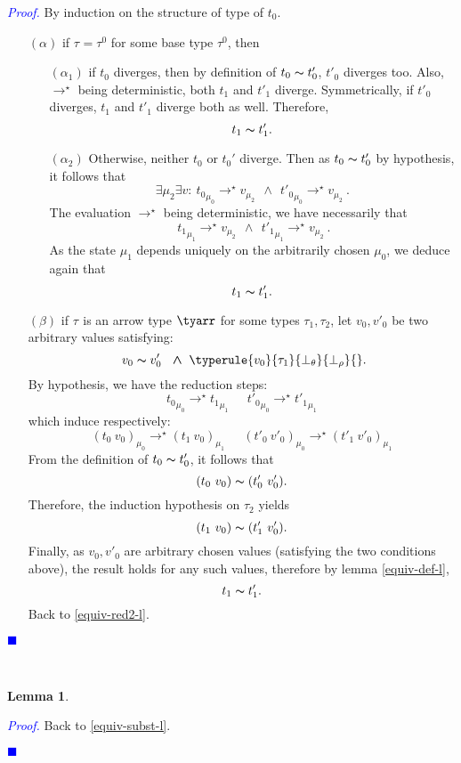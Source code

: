 \documentclass[a4paper,11pt,oneside]{article}
\theoremstyle{plain}
\newtheorem{lemma}[definition]{Lemma}
\renewenvironment{proof}{\noindent \textcolor{blue}{\textit{Proof.}}}
{{\begin{tiny}\textcolor{blue}{$\blacksquare$}\end{tiny}}\\}
\newcommand{\tmapp}[2]{(#1 ~ #2)}
\newcommand{\ty}[1][]{\tau_{#1}}
\newcommand{\bwedge}{\boldsymbol{~\wedge~}}
\newcommand{\bth}{\bot_\theta}
\newcommand{\brh}{\bot_\rho}
\newcommand{\evalstar}[4]{~#1_{\mu_#2} \rightarrow^{\star} #3_{\mu_#4} ~}
\newcommand{\eqv}[1]{#1 \thicksim #1'}
\begin{document}
	\begin{proof}
		By induction on the structure of type of $t_0$. 
		\begin{itemize}
		\item[$(\alpha)$] if $\ty = \ty^0$ for some base type $\ty^0$, then
		
			\begin{itemize}
			\item[$(\alpha_1)$] if $t_0$ diverges, then by definition of 
			$\eqv{t_0}$, $t'_0$ diverges too. Also, $\rightarrow^\star$ being 
			deterministic, both $t_1$ and $t'_1$ diverge. Symmetrically, if 
			$t'_0$ diverges, $t_1$ and $t'_1$ diverge both as well. Therefore,
			$$\eqv{t_1}.$$
						
			\item[$(\alpha_2)$] Otherwise, neither $t_0$ or $t_{0}'$ diverge. Then
				as $\eqv{t_0}$ by hypothesis, it follows that 
					$$ \exists \mu_2 \exists v: 
					\evalstar{{t_0}}{0}{v}{2} \bwedge \evalstar{{t'_0}}{0}{v}{2}.$$
				The evaluation $\rightarrow^\star$ being deterministic, we have 
				necessarily that
					$$\evalstar{{t_1}}{1}{v}{2} \bwedge \evalstar{{t'_1}}{1}{v}{2}.$$
				As the state $\mu_1$ depends uniquely on the arbitrarily chosen 
				$\mu_0$, we deduce again that $$\eqv{t_1}.$$					
			\end{itemize}			
			
		\item[$(\beta)$] if $\ty$ is an arrow type $\tyarr$ for some types 
		$\ty[1], \ty[2]$,	let $v_0, v'_0$ be two arbitrary values satisfying:
		$$~\eqv{v_0}~\bwedge \typerule{v_0}{\ty[1]}{\bth}{\brh}{}.$$
		By hypothesis, we have the reduction steps:
		$$\evalstar{{t_0}}{0}{{t_1}}{1}\quad\evalstar{{t'_0}}{0}{{t'_1}}{1}$$						which induce respectively: 
		$$\evalstar{\tmapp{t_0}{v_0}}{0}{\tmapp{t_1}{v_0}}{1} \quad
		\evalstar{\tmapp{t'_0}{v'_0}}{0}{\tmapp{t'_1}{v'_0}}{1}$$	
		From the definition of $\eqv{t_0}$, it follows that
		$${\tmapp{t_0}{v_0}} \thicksim {\tmapp{t'_0}{v'_0}}.$$
		Therefore, the induction hypothesis on $\ty[2]$ yields 
		$${\tmapp{t_1}{v_0}}\thicksim{\tmapp{t'_1}{v'_0}}.$$
		Finally, as $v_0, v'_0$ are arbitrary chosen values (satisfying the
		two conditions above), the result holds for any such values, 
		therefore by lemma \ref{equiv-def-l},
		$$\eqv{t_1}.$$ Back to \ref{equiv-red2-l}.	
		\end{itemize}	
	\end{proof}		

	\begin{lemma}

	\label{equiv-subst-p}
	\end{lemma}

	\begin{proof}
	Back to \ref{equiv-subst-l}.
	\end{proof}
	
\newpage


\end{document}

